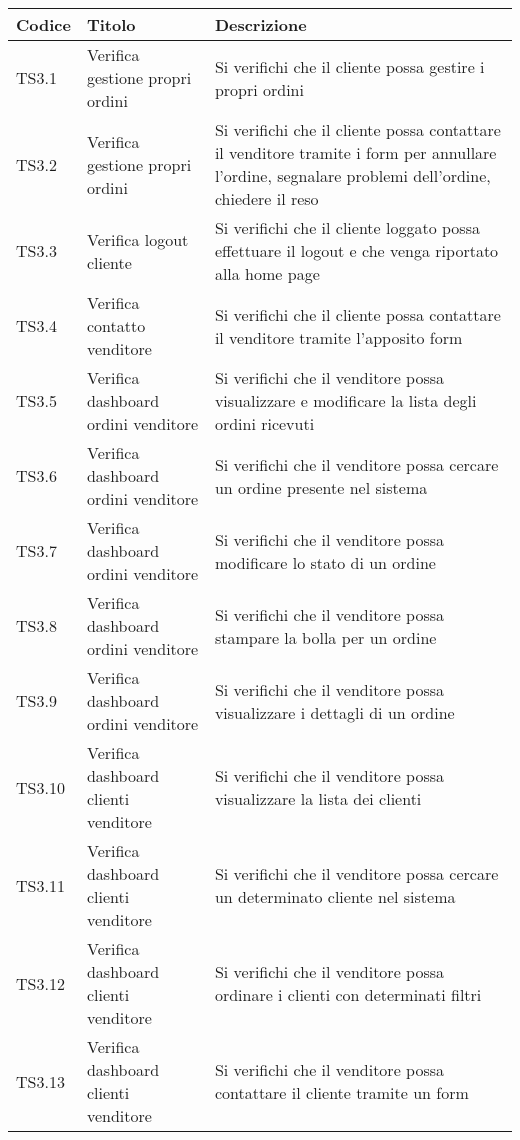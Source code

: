 \begin{center}
	\begin{longtable}{p{1cm}|p{6.85cm}|p{7cm}|}
	\hline
	\rowcolor{lighter-grayer}
	\textbf{Codice} & \textbf{Titolo} & \textbf{Descrizione} \\
	\hline
	\endfirsthead


	\hline
	TS3.1 & Verifica gestione propri ordini & Si verifichi che il cliente possa gestire i propri ordini  \\
	TS3.2 & Verifica gestione propri ordini & Si verifichi che il cliente possa contattare il venditore tramite i form per annullare l'ordine, segnalare problemi dell'ordine, chiedere il reso \\
	TS3.3 & Verifica logout cliente & Si verifichi che il cliente loggato possa effettuare il logout e che venga riportato alla home page \\
	TS3.4 & Verifica contatto venditore & Si verifichi che il cliente possa contattare il venditore tramite l'apposito form  \\
	TS3.5 & Verifica dashboard ordini venditore & Si verifichi che il venditore possa visualizzare e modificare la lista degli ordini ricevuti \\
	TS3.6 & Verifica dashboard ordini venditore & Si verifichi che il venditore possa cercare un ordine presente nel sistema \\
	TS3.7 & Verifica dashboard ordini venditore & Si verifichi che il venditore possa modificare lo stato di un ordine  \\
	TS3.8 & Verifica dashboard ordini venditore & Si verifichi che il venditore possa stampare la bolla per un ordine  \\
	TS3.9 & Verifica dashboard ordini venditore & Si verifichi che il venditore possa visualizzare i dettagli di un ordine \\
	TS3.10 & Verifica dashboard clienti venditore & Si verifichi che il venditore possa visualizzare la lista dei clienti \\
	TS3.11 & Verifica dashboard clienti venditore & Si verifichi che il venditore possa cercare un determinato cliente nel sistema \\
	TS3.12 & Verifica dashboard clienti venditore & Si verifichi che il venditore possa ordinare i clienti con determinati filtri \\
	TS3.13 & Verifica dashboard clienti venditore & Si verifichi che il venditore possa contattare il cliente tramite un form \\

\end{longtable}
\end{center}
